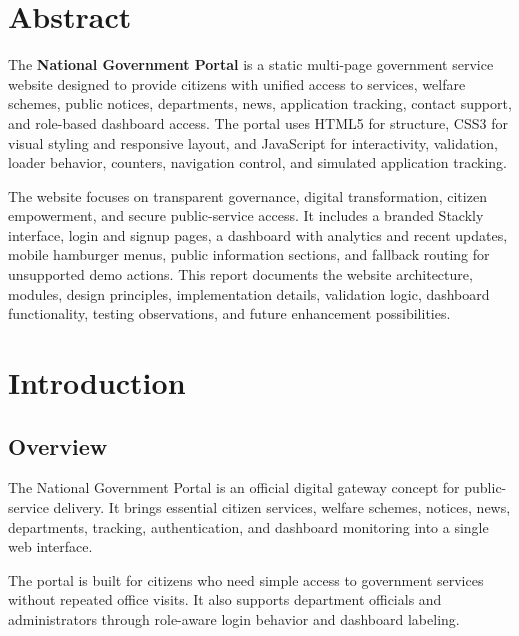 \documentclass[12pt,a4paper]{report}
\begin{document}
\chapter*{Abstract}
The \textbf{National Government Portal} is a static multi-page government service website designed to provide citizens with unified access to services, welfare schemes, public notices, departments, news, application tracking, contact support, and role-based dashboard access. The portal uses HTML5 for structure, CSS3 for visual styling and responsive layout, and JavaScript for interactivity, validation, loader behavior, counters, navigation control, and simulated application tracking.

The website focuses on transparent governance, digital transformation, citizen empowerment, and secure public-service access. It includes a branded Stackly interface, login and signup pages, a dashboard with analytics and recent updates, mobile hamburger menus, public information sections, and fallback routing for unsupported demo actions. This report documents the website architecture, modules, design principles, implementation details, validation logic, dashboard functionality, testing observations, and future enhancement possibilities.

\tableofcontents
\clearpage
{}

\chapter{Introduction}
\section{Overview}
The National Government Portal is an official digital gateway concept for public-service delivery. It brings essential citizen services, welfare schemes, notices, news, departments, tracking, authentication, and dashboard monitoring into a single web interface.

The portal is built for citizens who need simple access to government services without repeated office visits. It also supports department officials and administrators through role-aware login behavior and dashboard labeling.
\end{document}
